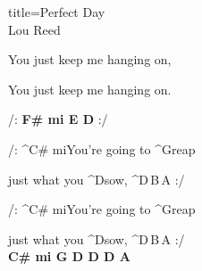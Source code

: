\begin{song}{title=\centering Perfect Day \\\normalsize Lou Reed \vspace*{-0.3cm}}
{\begin{minipage}[t]{0.53\textwidth}
	You just keep me hanging on, 
	
	You just keep me hanging on. 
 

 
/: \textbf{F\# mi  E  D} :/

 
\sloka 
	/: ^{C\# mi}You're going to ^{G}reap 
	
	just what you ^{D}sow,  ^{D\,B\,A} :/
 
 	/: ^{C\# mi}You're going to ^{G}reap 
 	
 	just what you ^{D}sow,  ^{D\,B\,A} :/\\
 	
 	
\textbf{C\# mi   G   D   D   D   A }

\end{minipage}
}
\setcounter{Slokočet}{0}
\end{song}

